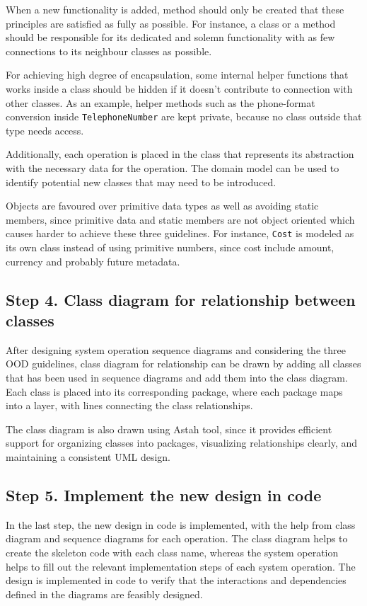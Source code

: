 \documentclass[a4paper]{scrartcl}
\begin{document}
When a new functionality is added, method should only be created that these principles are satisfied as fully as possible. For instance, a class or a method should be responsible for its dedicated and solemn functionality with as few connections to its neighbour classes as possible.

For achieving high degree of encapsulation, some internal helper functions that works inside a class should be hidden if it doesn't contribute to connection with other classes. As an example, helper methods such as the phone-format conversion inside \texttt{TelephoneNumber} are kept private, because no class outside that type needs access.

Additionally, each operation is placed in the class that represents its abstraction with the necessary data for the operation. The domain model can be used to identify potential new classes that may need to be introduced.

Objects are favoured over primitive data types as well as avoiding static members, since primitive data and static members are not object oriented which causes harder to achieve these three guidelines. For instance, \texttt{Cost} is modeled as its own class instead of using primitive numbers, since cost include amount, currency and probably future metadata.


\subsection{Step 4. Class diagram for relationship between classes}
After designing system operation sequence diagrams and considering the three OOD guidelines, class diagram for relationship can be drawn by adding all classes that has been used in sequence diagrams and add them into the class diagram. Each class is placed into its corresponding package, where each package maps into a layer, with lines connecting the class relationships.

The class diagram is also drawn using Astah tool, since it provides efficient support for organizing classes into packages, visualizing relationships clearly, and maintaining a consistent UML design.


\subsection{Step 5. Implement the new design in code}
In the last step, the new design in code is implemented, with the help from class diagram and sequence diagrams for each operation. The class diagram helps to create the skeleton code with each class name, whereas the system operation helps to fill out the relevant implementation steps of each system operation. The design is implemented in code to verify that the interactions and dependencies defined in the diagrams are feasibly designed.
\end{document}
